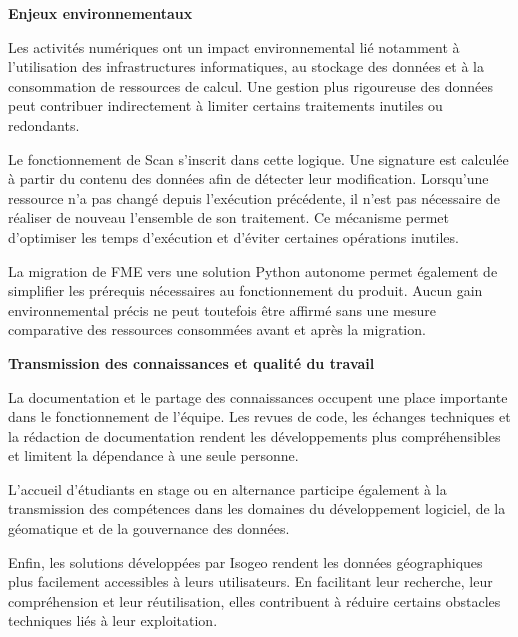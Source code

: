 \medskip

\noindent
\textbf{Enjeux environnementaux}

\medskip

Les activités numériques ont un impact environnemental lié notamment à
l'utilisation des infrastructures informatiques, au stockage des données et à
la consommation de ressources de calcul. Une gestion plus rigoureuse des
données peut contribuer indirectement à limiter certains traitements inutiles
ou redondants.

Le fonctionnement de Scan s'inscrit dans cette logique. Une signature est
calculée à partir du contenu des données afin de détecter leur modification.
Lorsqu'une ressource n'a pas changé depuis l'exécution précédente, il n'est pas
nécessaire de réaliser de nouveau l'ensemble de son traitement. Ce mécanisme
permet d'optimiser les temps d'exécution et d'éviter certaines opérations
inutiles.

La migration de FME vers une solution Python autonome permet également de
simplifier les prérequis nécessaires au fonctionnement du produit. Aucun gain
environnemental précis ne peut toutefois être affirmé sans une mesure
comparative des ressources consommées avant et après la migration.

\medskip

\noindent
\textbf{Transmission des connaissances et qualité du travail}

\medskip

La documentation et le partage des connaissances occupent une place importante
dans le fonctionnement de l'équipe. Les revues de code, les échanges
techniques et la rédaction de documentation rendent les développements plus
compréhensibles et limitent la dépendance à une seule personne.

L'accueil d'étudiants en stage ou en alternance participe également à la
transmission des compétences dans les domaines du développement logiciel, de
la géomatique et de la gouvernance des données.

Enfin, les solutions développées par Isogeo rendent les données géographiques
plus facilement accessibles à leurs utilisateurs. En facilitant leur
recherche, leur compréhension et leur réutilisation, elles contribuent à
réduire certains obstacles techniques liés à leur exploitation.


